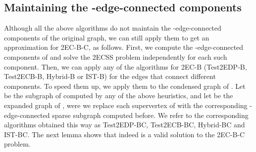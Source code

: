 \documentclass[11pt]{article}
\newcommand{\ignore}[1]{}
\newcommand{\sidenote}[1]{\textbf{(*)}\marginpar {\tiny \raggedright{(*) #1}}}
\begin{document}
\ignore{
Note that \textsf{Test2EDP-B}, \textsf{Test2ECB-B} and \textsf{Hybrid-B} produce the same approximation ratio with \textsf{IST-B} for \textsf{2EC-B} in  time
if they are run on the sparse subgraph computed by \textsf{IST-B} instead of the original digraph.
Given that \textsf{IST-B} achieves a 4-approximation (Theorem~\ref{theorem:ApproximationRatio}), it follows that \textsf{Test2EDP-B}, \textsf{Test2ECB-B} and \textsf{Hybrid-B}
produce a -approximation for \textsf{2EC-B} in  time.
Therefore, we applied this idea in all our implementations.
See Table \ref{tab:algorithms} in Section \ref{sec:experimental}. We note that for the tested inputs, the quality of the computed solutions was not affected significantly
by the fact that we applied the heuristics on the subgraph computed by \textsf{IST-B} instead of the original graph. Indeed, on average, the number of edges in the computed subgraph
was reduced by  for \textsf{Test2EDP-B} and increased by less than   for \textsf{Hybrid-B}, while the speedup attained was by a factor close to  for \textsf{Test2EDP-B} and by a factor slightly larger than  for \textsf{Hybrid-B}. \sidenote{LOUKAS: Added these averages.}
}

\subsection{Maintaining the -edge-connected components}
\label{sec:2-edge-components}

Although all the above algorithms do not maintain the -edge-connected components of the original graph, we can still apply them to get an approximation for \textsf{2EC-B-C}, as follows.
First, we compute the -edge-connected components of 
and solve the \textsf{2ECSS} problem independently for each such component. Then, we can apply any of the algorithms for \textsf{2EC-B} (\textsf{Test2EDP-B}, \textsf{Test2ECB-B}, \textsf{Hybrid-B} or \textsf{IST-B}) for the edges that connect different components.
To speed them up,  we apply them to the condensed graph  of .  Let  be the subgraph of  computed by any of the above heuristics, and let  be the expanded graph of , were we replace each supervertex of  with the corresponding -edge-connected sparse subgraph computed before.
We refer to the corresponding algorithms obtained this way as \textsf{Test2EDP-BC}, \textsf{Test2ECB-BC}, \textsf{Hybrid-BC} and \textsf{IST-BC}.
The next lemma shows that indeed  is a valid solution to the \textsf{2EC-B-C} problem.
\end{document}

